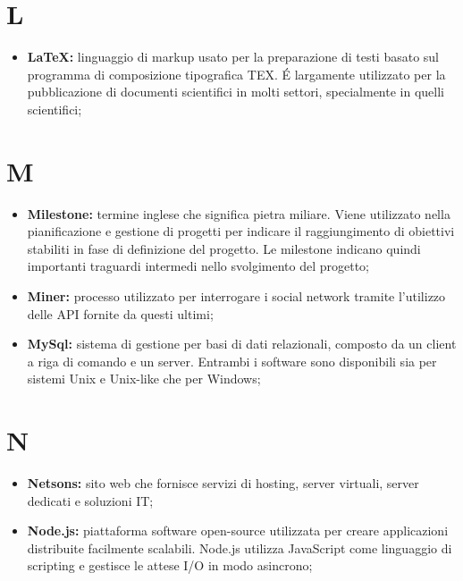 %


\section*{\Huge L} %
\label{sec:l}
	\begin{itemize}
		\item \textbf{\LaTeX:} linguaggio di markup usato per la preparazione di testi basato sul programma di composizione tipografica TEX. É largamente utilizzato per la pubblicazione di documenti scientifici in molti settori, specialmente in quelli scientifici;
	\end{itemize}
\pagebreak

\section*{\Huge M} %
\label{sec:m}
	\begin{itemize}
		\item \textbf{Milestone:} termine inglese che significa pietra miliare. Viene utilizzato nella pianificazione e gestione di progetti per indicare il raggiungimento di obiettivi stabiliti in fase di definizione del progetto. Le milestone indicano quindi importanti traguardi intermedi nello svolgimento del progetto;
		\item \textbf{Miner:} processo utilizzato per interrogare i social network tramite l'utilizzo delle API fornite da questi ultimi;	
		\item \textbf{MySql:} sistema di gestione per basi di dati relazionali, composto da un client a riga di comando e un server. Entrambi i software sono disponibili sia per sistemi Unix e Unix-like che per Windows;
	\end{itemize}
\pagebreak

\section*{\Huge N} %
\label{sec:n}
	\begin{itemize}
		\item \textbf{Netsons:} sito web che fornisce servizi di hosting, server virtuali, server dedicati e soluzioni IT;
		\item \textbf{Node.js:} piattaforma software open-source utilizzata per creare applicazioni distribuite facilmente scalabili. Node.js utilizza JavaScript come linguaggio di scripting e gestisce le attese I/O in modo asincrono;
	\end{itemize}
\pagebreak
